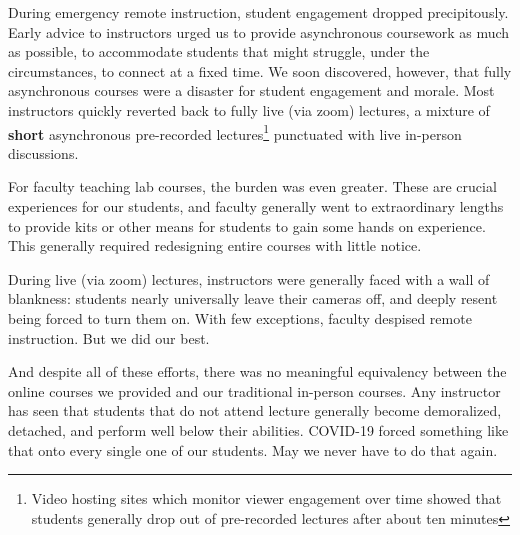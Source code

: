 \documentclass[12pt]{article}
\begin{document}
During emergency remote instruction, student engagement dropped
precipitously.  Early advice to instructors urged us to provide
asynchronous coursework as much as possible, to accommodate students
that might struggle, under the circumstances, to connect at a fixed
time.  We soon discovered, however, that fully asynchronous courses 
were a disaster for student engagement and morale.  Most instructors
quickly reverted back to fully live (via zoom) lectures, a mixture of
{\bf short} asynchronous pre-recorded lectures\footnote{Video hosting
  sites which monitor viewer engagement over time showed that students
  generally drop out of pre-recorded lectures after about ten minutes}
punctuated with live in-person discussions.

For faculty teaching lab courses, the burden was even greater.  These
are crucial experiences for our students, and faculty generally went
to extraordinary lengths to provide kits or other means for students
to gain some hands on experience.  This generally required redesigning
entire courses with little notice.

During live (via zoom) lectures, instructors were generally faced with
a wall of blankness: students nearly universally leave their cameras
off, and deeply resent being forced to turn them on.  With few
exceptions, faculty despised remote instruction.  But we did our best.

And despite all of these efforts, there was no meaningful equivalency
between the online courses we provided and our traditional in-person
courses.  Any instructor has seen that students that do not attend
lecture generally become demoralized, detached, and perform well below
their abilities.  COVID-19 forced something like that onto every single
one of our students.  May we never have to do that again.
\end{document}
